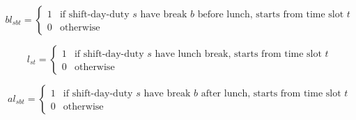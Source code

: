 \begin{equation}
bl_{sbt} = \left\{ \begin{array}{cc}
		1 & \mbox{if shift-day-duty $s$ have break $b$ before lunch, starts from time slot $t$} \\
		0 & \mbox{otherwise}
	    \end{array}
    \right.
\end{equation}

\begin{equation}
l_{st} = \left\{ \begin{array}{cc}
		1 & \mbox{if shift-day-duty $s$ have lunch break, starts from time slot $t$} \\
		0 & \mbox{otherwise}
	    \end{array}
    \right.
\end{equation}


\begin{equation}
al_{sbt} = \left\{ \begin{array}{cc}
		1 & \mbox{if shift-day-duty $s$ have break $b$ after lunch, starts from time slot $t$} \\
		0 & \mbox{otherwise}
	    \end{array}
    \right.
\end{equation}



